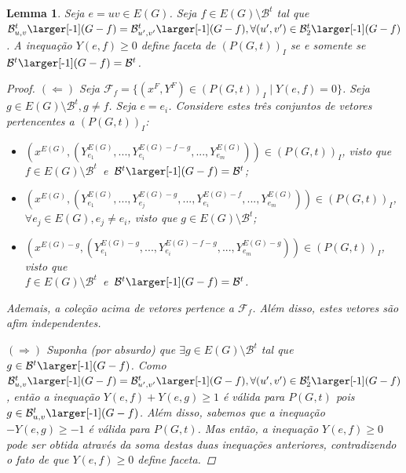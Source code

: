 \documentclass[11pt,reqno]{amsart}
\newcommand{\smallGf}{\mbox{\larger[-1]$(G-f)$}}
\newcommand{\spanBridge}{\mathcal{B}}
\newcommand{\Bridgeuv}{\spanBridge_{u,v}^{t}}
\newcommand{\Bridge}{\spanBridge^{t}}
\newcommand{\BridgeuvPrimeGf}{\spanBridge_{u',v'}^{t}\smallGf}
\newcommand{\BridgeuvGf}{\Bridgeuv\smallGf}
\newcommand{\BridgeGf}{\Bridge\smallGf}
\newcommand{\BridgeTwo}{\spanBridge_{2}^{t}}
\newcommand{\BridgeTwoGf}{\BridgeTwo\smallGf}
\newtheorem{lema}{Lemma}
\newcommand{\incid}{\mathcal{X}}
\newcommand{\incidY}{\mathcal{Y}}
\newcommand{\facetF}{\mathcal{F}}
\begin{document}
\begin{lema}
Seja $e = uv \in E(G)$. 
Seja $f \in E(G) \setminus \Bridge$ tal que 
$\BridgeuvGf = \BridgeuvPrimeGf, \forall (u',v') \in \BridgeTwoGf$. %
A inequação $Y(e,f) \ge 0$ define faceta de 
$(P(G,t))_{I}$ se e somente se $\BridgeGf = \Bridge$.
\begin{proof}
$(\Leftarrow)$ Seja $\facetF_f = \{(x^{F},Y^{F}) \in (P(G,t))_I\; |\; Y(e,f) = 0\}$. 
Seja $g \in E(G) \setminus \Bridge, g \neq f$. 
Seja $e = e_i$. Considere estes três conjuntos de vetores pertencentes a $(P(G,t))_{I}$:
\begin{itemize}
  \item $(x^{E(G)},(Y_{e_1}^{E(G)}, ..., Y_{e_i}^{E(G)-f-g}, ..., Y_{e_m}^{E(G)})) \in (P(G,t))_{I}$, visto que \\
\mbox{$f \in E(G) \setminus \Bridge$ e $\BridgeGf = \Bridge$};
  \item $(x^{E(G)},(Y_{e_1}^{E(G)}, ..., Y_{e_j}^{E(G)-g}, ..., Y_{e_i}^{E(G)-f}, ..., Y_{e_m}^{E(G)})) \in (P(G,t))_{I}$, \\$\forall e_j \in E(G), e_j \neq e_i$, visto que 
$g \in E(G) \setminus \Bridge$;
  \item $(x^{E(G)-g},(Y_{e_1}^{E(G)-g}, ..., Y_{e_i}^{E(G)-f-g}, ..., Y_{e_m}^{E(G)-g})) \in (P(G,t))_{I}$, visto que \\
\mbox{$f \in E(G) \setminus \Bridge$ e $\BridgeGf = \Bridge$}.
\end{itemize} 
Ademais, a coleção acima de vetores pertence a $\facetF_f$. Além disso, estes vetores 
são afim independentes.%

$(\Rightarrow)$ Suponha (por absurdo) que $\exists g \in E(G) \setminus \Bridge$ tal que 
$g \in \BridgeGf$. %
Como $\BridgeuvGf = \BridgeuvPrimeGf, \forall (u',v') \in \BridgeTwoGf$, 
então a inequação $Y(e,f) + Y(e,g) \ge 1$ é válida para 
$P(G,t)$ pois %
$g \in \BridgeuvGf$. %
Além disso, sabemos que 
a inequação $-Y(e,g) \ge -1$ é válida para $P(G,t)$. Mas então, a inequação 
$Y(e,f) \ge 0$ pode ser obtida através da soma destas duas inequações anteriores, 
contradizendo o fato de que $Y(e,f) \ge 0$ define faceta.
\end{proof}
\end{lema}
\end{document}
